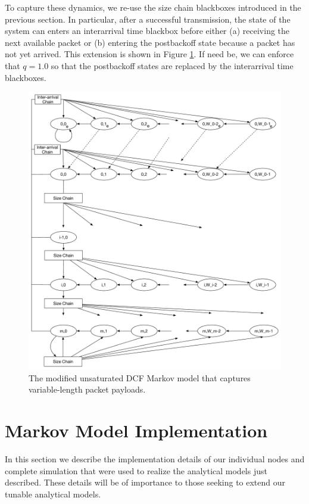 \documentclass{llncs}
\begin{document}
To capture these dynamics, we re-use the size chain blackboxes introduced in the previous section. In particular, after a successful transmission, the state of the system can enters an interarrival time blackbox before either (a) receiving the next available packet or (b) entering the postbackoff state because a packet has not yet arrived. This extension is shown in Figure \ref{fig:dcf_model_unsaturated_varpktsize_interarrival}. If need be, we can enforce that $q = 1.0$ so that the postbackoff states are replaced by the interarrival time blackboxes. 

\begin{figure}
\begin{center}
\includegraphics[scale=0.35]{../../sketches/dcf_model_unsaturated_varpktsize_interarrival.pdf}
\caption{The modified unsaturated DCF Markov model that captures variable-length packet payloads.}
\label{fig:dcf_model_unsaturated_varpktsize_interarrival}
\end{center}
\end{figure}

\section{Markov Model Implementation}
In this section we describe the implementation details of our individual nodes and complete simulation that were used to realize the analytical models just described. These details will be of importance to those seeking to extend our tunable analytical models. 
\end{document}
